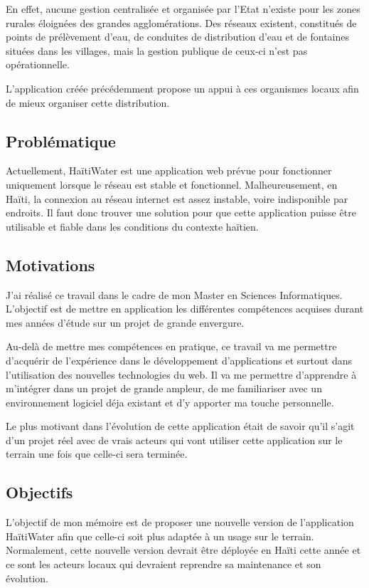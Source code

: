 \documentclass{EPL-master-thesis-covers-FR}
\begin{document}
			 En effet, aucune gestion centralisée et organisée par l'Etat n'existe pour les zones rurales éloignées des grandes agglomérations. Des réseaux existent, constitués de points de prélèvement d'eau, de conduites de distribution d'eau et de fontaines situées dans les villages, mais la gestion publique de ceux-ci n'est pas opérationnelle. 

			L'application créée précédemment \cite{ref:haitiwater} propose un appui à ces organismes locaux afin de mieux organiser cette distribution. 

			

		\subsection*{Problématique}
			Actuellement, HaïtiWater est une application web prévue pour fonctionner uniquement lorsque le réseau est stable et fonctionnel. Malheureusement, en Haïti, la connexion au réseau internet est assez instable, voire indisponible par endroits. Il faut donc trouver une solution pour que cette application puisse être utilisable et fiable dans les conditions du contexte haïtien. 


		\subsection*{Motivations}
			J'ai réalisé ce travail dans le cadre de mon Master en Sciences Informatiques. L'objectif est de mettre en application les différentes compétences acquises durant mes années d'étude sur un projet de grande envergure.
			
			Au-delà de mettre mes compétences en pratique, ce travail va me permettre d'acquérir de l'expérience dans le développement d'applications et surtout dans l'utilisation des nouvelles technologies du web. Il va me permettre d'apprendre à m'intégrer dans un projet de grande ampleur, de me familiariser avec un environnement logiciel déja existant et d'y apporter ma touche personnelle.	
			
			Le plus motivant dans l'évolution de cette application était de savoir qu'il s'agit d'un projet réel avec de vrais acteurs qui vont utiliser cette application sur le terrain une fois que celle-ci sera terminée.


		\subsection*{Objectifs}
			L'objectif de mon mémoire est de proposer une nouvelle version de l'application HaïtiWater afin que celle-ci soit plus adaptée à un usage sur le terrain. Normalement, cette nouvelle version devrait être déployée en Haïti cette année et ce sont les acteurs locaux qui devraient reprendre sa maintenance et son évolution.
			
\end{document}
